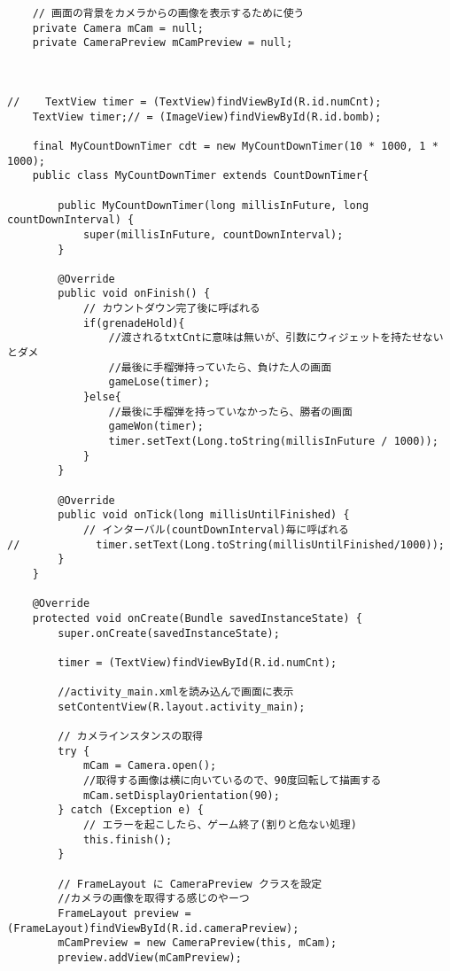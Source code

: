 \documentclass[11pt,a4j]{jarticle}
\begin{document}
\begin{verbatim}
    // 画面の背景をカメラからの画像を表示するために使う
    private Camera mCam = null;
    private CameraPreview mCamPreview = null;



//    TextView timer = (TextView)findViewById(R.id.numCnt);
    TextView timer;// = (ImageView)findViewById(R.id.bomb);

    final MyCountDownTimer cdt = new MyCountDownTimer(10 * 1000, 1 * 1000);
    public class MyCountDownTimer extends CountDownTimer{

        public MyCountDownTimer(long millisInFuture, long countDownInterval) {
            super(millisInFuture, countDownInterval);
        }

        @Override
        public void onFinish() {
            // カウントダウン完了後に呼ばれる
            if(grenadeHold){
                //渡されるtxtCntに意味は無いが、引数にウィジェットを持たせないとダメ
                //最後に手榴弾持っていたら、負けた人の画面
                gameLose(timer);
            }else{
                //最後に手榴弾を持っていなかったら、勝者の画面
                gameWon(timer);
                timer.setText(Long.toString(millisInFuture / 1000));
            }
        }

        @Override
        public void onTick(long millisUntilFinished) {
            // インターバル(countDownInterval)毎に呼ばれる
//            timer.setText(Long.toString(millisUntilFinished/1000));
        }
    }

    @Override
    protected void onCreate(Bundle savedInstanceState) {
        super.onCreate(savedInstanceState);

        timer = (TextView)findViewById(R.id.numCnt);
        
        //activity_main.xmlを読み込んで画面に表示
        setContentView(R.layout.activity_main);

        // カメラインスタンスの取得
        try {
            mCam = Camera.open();
            //取得する画像は横に向いているので、90度回転して描画する
            mCam.setDisplayOrientation(90);
        } catch (Exception e) {
            // エラーを起こしたら、ゲーム終了(割りと危ない処理)
            this.finish();
        }

        // FrameLayout に CameraPreview クラスを設定
        //カメラの画像を取得する感じのやーつ
        FrameLayout preview = (FrameLayout)findViewById(R.id.cameraPreview);
        mCamPreview = new CameraPreview(this, mCam);
        preview.addView(mCamPreview);
        

\end{verbatim}
\end{document}
